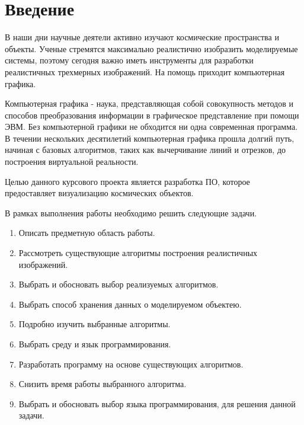 \newpage
\chapter*{Введение}

В наши дни научные деятели активно изучают космические пространства и объекты. Ученые стремятся максимально реалистично изобразить моделируемые системы, поэтому сегодня важно иметь инструменты для разработки реалистичных трехмерных изображений. На помощь приходит компьютерная графика.

Компьютерная графика - наука, представляющая собой совокупность методов и способов преобразования информации в графическое представление при помощи ЭВМ. Без компьютерной графики не обходится ни одна современная программа. В течении нескольких десятилетий компьютерная графика прошла долгий путь, начиная с базовых алгоритмов, таких как вычерчивание линий и отрезков, до построения виртуальной реальности.

Целью данного курсового проекта является разработка ПО, которое предоставляет визуализацию космических объектов.

В рамках выполнения работы необходимо решить следующие задачи.

\begin{enumerate}
	\item Описать предметную область работы.
	\item Рассмотреть существующие алгоритмы построения реалистичных изображений.
	\item Выбрать и обосновать выбор реализуемых алгоритмов.
	\item Выбрать способ хранения данных о моделируемом объектею.
	\item Подробно изучить выбранные алгоритмы.
	\item Выбрать среду и язык программирования.	
	\item Разработать программу на основе существующих алгоритмов.
	\item Снизить время работы выбранного алгоритма.
	\item Выбрать и обосновать выбор языка программирования, для решения данной задачи.
\end{enumerate}